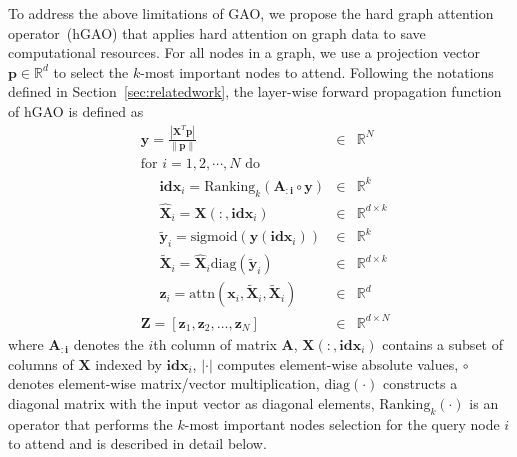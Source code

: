 \documentclass[sigconf]{acmart}
\begin{document}
To address the above limitations of GAO, we propose the hard graph
attention operator~(hGAO) that applies hard attention on graph data
to save computational resources. For all nodes in a graph, we use a
projection vector $\boldsymbol p \in \mathbb{R}^{d}$ to select the
$k$-most important nodes to attend. Following the notations defined
in Section~\ref{sec:relatedwork}, the layer-wise forward propagation
function of hGAO is defined as
\begin{align}
&\boldsymbol y = \frac{|\boldsymbol X^T \boldsymbol p|}{\lVert \boldsymbol p \rVert} &\in& \mathbb{R}^{N}\label{eq:proj} \\
&\mbox{for } i = 1, 2, \cdots, N \mbox{ do} \nonumber \\
&\,\,\,\,\,\,\,\,\boldsymbol{idx}_i = \mbox{Ranking}_k(\boldsymbol{A_{:i}} \circ \boldsymbol y) &\in& \mathbb{R}^{k}\label{eq:rank} \\
&\,\,\,\,\,\,\,\,\boldsymbol{\hat X}_i = \boldsymbol X(:,\boldsymbol{idx}_i) &\in& \mathbb{R}^{d\times k}\label{eq:extract} \\
&\,\,\,\,\,\,\,\,\boldsymbol{\tilde y}_i = \mbox{sigmoid} (\boldsymbol y(\boldsymbol{idx}_i)) &\in& \mathbb{R}^{k}\label{eq:sigmoid}\\
&\,\,\,\,\,\,\,\,\boldsymbol{\tilde X}_i = \boldsymbol{\hat X}_i \mbox{diag}(\boldsymbol{\tilde y}_i) &\in& \mathbb{R}^{d\times k}\label{eq:gate} \\
&\,\,\,\,\,\,\,\,\boldsymbol z_i = \mbox{attn}(\boldsymbol x_i, \boldsymbol{\tilde X}_i, \boldsymbol{\tilde X}_i) &\in& \mathbb{R}^{d}\label{eq:iatt} \\
& \boldsymbol Z = [\boldsymbol z_1, \boldsymbol z_2, \ldots, \boldsymbol z_N] & \in& \mathbb{R}^{d \times N}\label{eq:combine}
\end{align}
where $\boldsymbol{A_{:i}}$ denotes the $i$th column of matrix
$\boldsymbol{A}$, $\boldsymbol X(:,\boldsymbol{idx}_i)$ contains a
subset of columns of $\boldsymbol X$ indexed by
$\boldsymbol{idx}_i$, $|\cdot|$ computes element-wise absolute
values, $\circ$ denotes element-wise matrix/vector multiplication,
$\mbox{diag}(\cdot)$ constructs a diagonal matrix with the input
vector as diagonal elements, $\mbox{Ranking}_k(\cdot)$ is an
operator that performs the $k$-most important nodes selection for
the query node $i$ to attend and is described in detail below.
\end{document}
